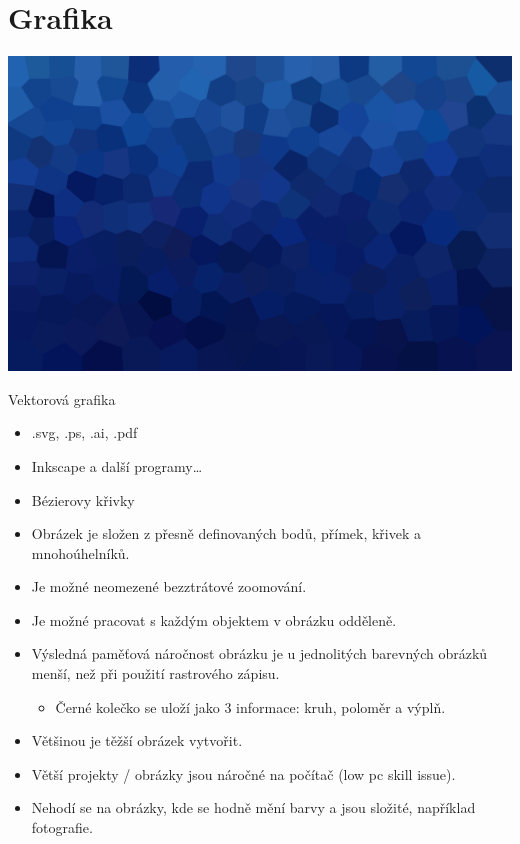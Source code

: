 \documentclass[aspectratio=169,xcolor=dvipsnames, t]{beamer}
\begin{document}
\section{Grafika}
{
{
    \includegraphics[width=\paperwidth,height=\paperheight]{AICStyleData/logos/mene_polygonu_bg.png}
}
\begin{frame}{Vektorová grafika}
    \begin{itemize}
        \item .svg, .ps, .ai, .pdf
        \item Inkscape a další programy\ldots
        \item Bézierovy křivky
        \item Obrázek je složen z přesně definovaných bodů, přímek, křivek a mnohoúhelníků.
        \item Je možné neomezené bezztrátové zoomování.
        \item Je možné pracovat s každým objektem v obrázku odděleně.
        \item Výsledná paměťová náročnost obrázku je u jednolitých barevných obrázků menší, než při použití rastrového zápisu.
        \begin{itemize}
            \item Černé kolečko se uloží jako 3 informace: kruh, poloměr a výplň.
        \end{itemize}
        \item Většinou je těžší obrázek vytvořit.
        \item Větší projekty / obrázky jsou náročné na počítač (low pc skill issue).
        \item Nehodí se na obrázky, kde se hodně mění barvy a jsou složité, například fotografie.
    \end{itemize}
\end{frame}

}
\end{document}
